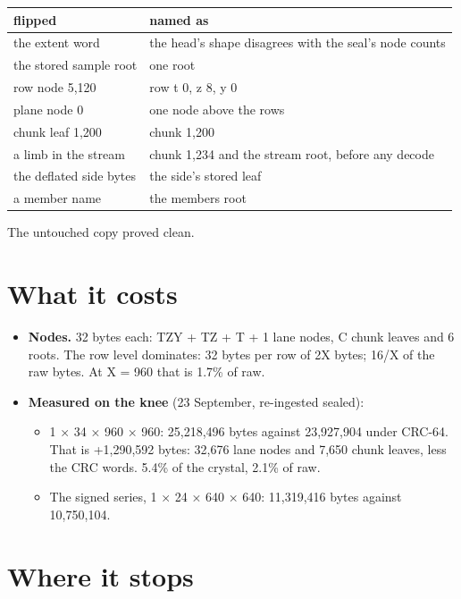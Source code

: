 {\small
\setlength{\tabcolsep}{6pt}
\begin{longtable}{>{\RaggedRight\arraybackslash}p{}>{\RaggedRight\arraybackslash}p{}}
\toprule
flipped & named as \\
\midrule
\endhead
the extent word & the head's shape disagrees with the seal's node counts \\
the stored sample root & one root \\
row node 5,120 & row t 0, z 8, y 0 \\
plane node 0 & one node above the rows \\
chunk leaf 1,200 & chunk 1,200 \\
a limb in the stream & chunk 1,234 and the stream root, before any decode \\
the deflated side bytes & the side's stored leaf \\
a member name & the members root \\
\bottomrule
\end{longtable}
}

The untouched copy proved clean.

\section{\texorpdfstring{What it costs}{What it costs}}

\begin{itemize}
\item \textbf{Nodes.} 32 bytes each: TZY + TZ + T + 1 lane nodes, C chunk leaves and 6 roots. The row level dominates: 32 bytes per row of 2X bytes; 16/X of the raw bytes. At X = 960 that is 1.7\% of raw.
\item \textbf{Measured on the knee} (23 September, re-ingested sealed):

\begin{itemize}
\item 1 × 34 × 960 × 960: 25,218,496 bytes against 23,927,904 under CRC-64. That is +1,290,592 bytes: 32,676 lane nodes and 7,650 chunk leaves, less the CRC words. 5.4\% of the crystal, 2.1\% of raw.
\item The signed series, 1 × 24 × 640 × 640: 11,319,416 bytes against 10,750,104.
\end{itemize}
\end{itemize}

\section{\texorpdfstring{Where it stops}{Where it stops}}

